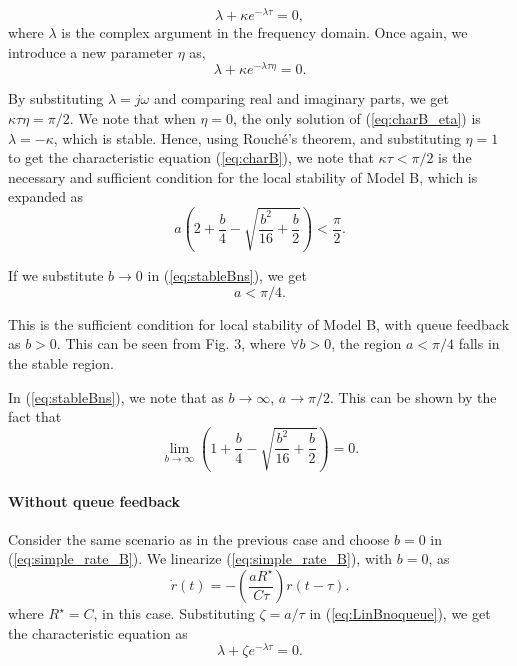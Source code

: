 \documentclass[conference]{IEEEtran}
\begin{document}
\begin{equation}
\label{eq:charB}
\lambda + \kappa e^{-\lambda\tau} = 0,
\end{equation}
where $\lambda$ is the complex argument in the frequency domain. Once again, we introduce
a new parameter $\eta$ as,
\begin{equation}
\label{eq:charB_eta}
\lambda + \kappa e^{-\lambda\tau\eta} = 0.
\end{equation}

By substituting $\lambda = j\omega$ and comparing real and imaginary parts, we get $\kappa\tau\eta = \pi/2$. We note that when $\eta = 0$, the only 
solution of (\ref{eq:charB_eta}) is $\lambda = -\kappa$, which is stable. Hence, using 
Rouch\'{e}'s theorem, and substituting $\eta = 1$ to get the characteristic equation (\ref{eq:charB}), we note that $\kappa\tau < \pi/2$ is the necessary and 
sufficient condition for the local stability of Model B, which is expanded as
\begin{equation}
\label{eq:stableBns}
a\left(2 + \frac{b}{4} - \sqrt{\frac{b^{2}}{16} + \frac{b}{2}}\right) < \frac{\pi}{2}.
\end{equation}

If we substitute $b \rightarrow 0$ in (\ref{eq:stableBns}), we get 
\begin{equation}
\label{eq:stableBs}
a < \pi/4.
\end{equation}

This is the sufficient condition for local stability of Model B, with queue feedback as 
$b > 0$. This can be seen from Fig. 3, where $\forall b > 0$, the region $a < \pi/4$ falls in the stable region. 

In (\ref{eq:stableBns}), we note that as $b \rightarrow \infty$, $a \rightarrow \pi/2$. This 
can be shown by the fact that 
\begin{equation}
\lim_{b \rightarrow \infty}\left(1 + \frac{b}{4} - \sqrt{\frac{b^{2}}{16} + \frac{b}{2}}\right) = 0.
\end{equation}

\paragraph{Without queue feedback}
Consider the same scenario as in the previous case and choose $b = 0$ in (\ref{eq:simple_rate_B}).
We linearize (\ref{eq:simple_rate_B}), with $b = 0$, as
\begin{equation}
\label{eq:LinBnoqueue}
\dot{r}\left(t\right) = 
-\left(\frac{aR^{\star}}{C\tau}\right)r\left(t-\tau\right).
\end{equation}
where $R^{\star} = C$, in this case. Substituting $\zeta = a/\tau$ in (\ref{eq:LinBnoqueue}), we get the characteristic equation as
\begin{equation}
\label{eq:char_mod_B_noq}
\lambda + \zeta e^{-\lambda\tau} = 0.
\end{equation}
\end{document}
